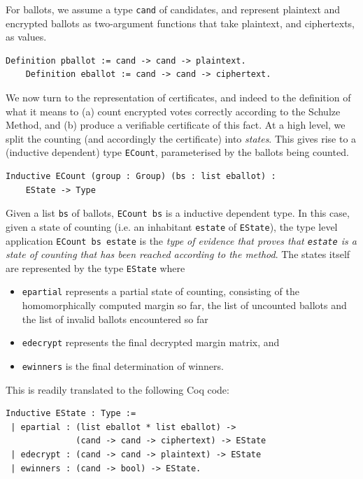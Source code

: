 For ballots, we assume a type \texttt{cand} of candidates, and
represent plaintext and encrypted ballots as two-argument functions
that take plaintext, and ciphertexts, as values. 
\begin{lstlisting}[frame=single,basicstyle=\ttfamily\footnotesize]
    Definition pballot := cand -> cand -> plaintext.
    Definition eballot := cand -> cand -> ciphertext.
\end{lstlisting}


 We now turn to the representation of certificates, and indeed to the
  definition of what it means to (a) count encrypted votes correctly
  according to the Schulze Method, and (b) produce a verifiable
  certificate of this fact. At a high level, we split the counting
  (and accordingly the certificate) into \emph{states}. This gives
  rise to a (inductive dependent) type \texttt{ECount}, parameterised
  by the ballots being counted.

  \begin{lstlisting}[frame=single,basicstyle=\ttfamily\footnotesize]
  Inductive ECount (group : Group) (bs : list eballot) : 
    EState -> Type
  \end{lstlisting}

  \noindent
  Given a list \texttt{bs} of ballots, \texttt{ECount bs} is a
  inductive dependent type. In this case, given a state of counting
  (i.e. an inhabitant \texttt{estate} of \texttt{EState}), the type level application
  \texttt{ECount bs estate} is the \emph{type of evidence that proves
  that \texttt{estate} is a state of counting that has been reached
  according to the method}.  The states itself are represented by
  the type \texttt{EState}
where
\begin{itemize}
 \item \texttt{epartial} represents a partial state of counting,
 consisting of the homomorphically computed margin so far, the list
 of uncounted ballots and the list of invalid ballots encountered so
 far
 \item \texttt{edecrypt} represents the final decrypted margin
 matrix, and 
 \item \texttt{ewinners} is the final determination of winners. 
\end{itemize}
This is readily translated to the following Coq code:
 
\begin{lstlisting}[frame=single,basicstyle=\ttfamily\footnotesize]
Inductive EState : Type :=
 | epartial : (list eballot * list eballot) ->
              (cand -> cand -> ciphertext) -> EState
 | edecrypt : (cand -> cand -> plaintext) -> EState
 | ewinners : (cand -> bool) -> EState.
\end{lstlisting}


